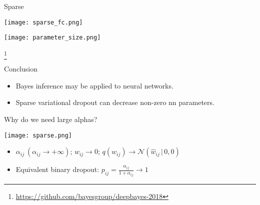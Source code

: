 \documentclass[14pt,mathserif,aspectratio=43,unicode]{beamer}
\newcommand\articlenote[1]{%
  \begingroup%
  \renewcommand\thefootnote{}\footnote{#1}%
  \addtocounter{footnote}{-1}%
  \endgroup%
}
\begin{document}
\begin{frame}{Sparse}
    \begin{center}
        \texttt{[image: sparse\_fc.png]}
        
        \texttt{[image: parameter\_size.png]}
    \end{center}
    
    \articlenote{\url{https://github.com/bayesgroup/deepbayes-2018}}
\end{frame}

\begin{frame}{Conclusion}
    \begin{itemize}
        \item Bayes inference may be applied to neural networks.
        \item Sparse variational dropout can decrease non-zero nn parameters.
    \end{itemize}
\end{frame}

\begin{frame}{Why do we need large alphas?}
    \begin{center}
        \texttt{[image: sparse.png]}
    \end{center}
    
    \begin{itemize}
        \item $\alpha_{ij}\ (\alpha_{ij}\to+\infty)$; $w_{ij}\to0$; $q(w_{ij})\to\mathcal{N}(\hat{w}_{ij}\,|\,0, 0)$
        \item Equivalent binary dropout: $p_{ij}=\frac{\alpha_{ij}}{1+\alpha_{ij}}\to1$
    \end{itemize}
\end{frame}
\end{document}
